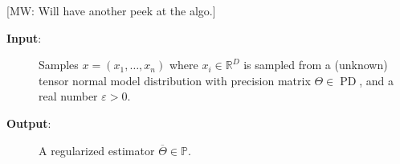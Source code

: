 \documentclass[aos]{imsart}
\theoremstyle{definition}
\numberwithin{equation}{section}
\DeclareMathOperator{\PD}{PD}
\newcommand{\R}{{\mathbb{R}}}
\newcommand{\otheta}{\overline{\Theta}}
\newcommand{\eps}{\varepsilon}
\newcommand{\cN}{\mathcal{N}}
\newcommand{\SPD}{\mathbb{P}}
\newcommand{\samp}{x}
\newcommand{\CF}[1]{{\color{purple}[CF: #1]}}
\newcommand{\MW}[1]{{\color{red}[MW: #1]}}
\newcommand{\CF}[1]{{}}
\newcommand{\MW}[1]{{}}
\begin{document}
\MW{Will have another peek at the algo.}
\begin{Algorithm}
\begin{description}
\item[\hspace{.2cm}\textbf{Input}:] Samples $\samp = (\samp_1, \ldots, \samp_n)$ where $\samp_i \in \R^D$ is sampled from a (unknown) tensor normal model distribution with precision matrix $\Theta \in \PD$,
and a real number $\eps > 0$.

\item[\hspace{.2cm}\textbf{Output}:] A regularized estimator $\otheta \in \SPD$.\\[.1ex]


\end{description}
\end{Algorithm}
\end{document}
